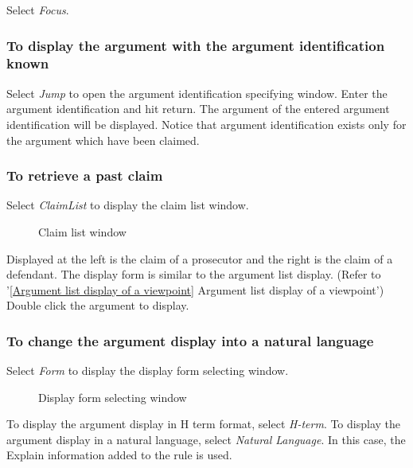 Select {\sl Focus}.

\subsubsection{To display the argument with the argument identification known}

Select {\sl Jump} to open the argument identification specifying window.
Enter the argument identification and hit return.
The argument of the entered argument identification will be displayed.  Notice that argument identification exists only for the argument which have been claimed.

\subsubsection{To retrieve a past claim}

Select {\sl ClaimList} to display the claim list window.

\begin{figure}[htb]
\begin{center}
\end{center}
\caption{Claim list window}\label{Claim list window}
\end{figure}

Displayed at the left is the claim of a prosecutor and the right is the claim of a defendant.
The display form is similar to the argument list display. (Refer to '\ref{Argument list display of a viewpoint} Argument list display of a viewpoint')
Double click the argument to display.

\subsubsection{To change the argument display into a natural language}

Select {\sl Form} to display the display form selecting window.

\begin{figure}[htb]
\begin{center}
\end{center}
\caption{Display form selecting window}\label{Display form selecting window}
\end{figure}

To display the argument display in H term format, select {\sl H-term}.  To display the argument display in a natural language, select {\sl Natural Language}.  In this case, the Explain information added to the rule is used.

